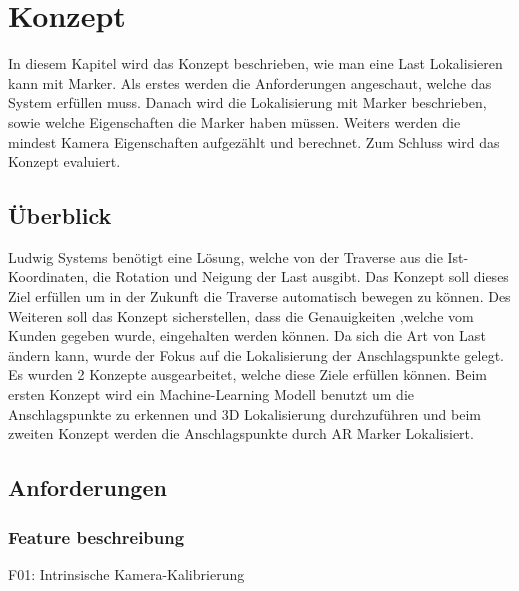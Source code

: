 \section{Konzept}

In diesem Kapitel wird das Konzept beschrieben, wie man eine Last Lokalisieren kann mit Marker.
Als erstes werden die Anforderungen angeschaut, welche das System erfüllen muss. 
Danach wird die Lokalisierung mit Marker beschrieben, sowie welche Eigenschaften die Marker haben müssen.
Weiters werden die mindest Kamera Eigenschaften aufgezählt und berechnet.
Zum Schluss wird das Konzept evaluiert.

\subsection{Überblick}
Ludwig Systems benötigt eine Lösung, welche von der Traverse aus die Ist-Koordinaten, die Rotation und Neigung der Last ausgibt. Das Konzept soll dieses Ziel erfüllen um in der Zukunft die Traverse automatisch bewegen zu können. Des Weiteren soll das Konzept sicherstellen, dass die Genauigkeiten ,welche vom Kunden gegeben wurde, eingehalten werden können. 
Da sich die Art von Last ändern kann, wurde der Fokus auf die Lokalisierung der Anschlagspunkte gelegt. 
Es wurden 2 Konzepte ausgearbeitet, welche diese Ziele erfüllen können. Beim ersten Konzept wird ein Machine-Learning Modell benutzt um die Anschlagspunkte zu erkennen und 3D Lokalisierung durchzuführen und beim zweiten Konzept werden die Anschlagspunkte durch AR Marker 
Lokalisiert.

\subsection{Anforderungen}
\label{sec:requirements}

\subsubsection{Feature beschreibung}


F01: Intrinsische Kamera-Kalibrierung

